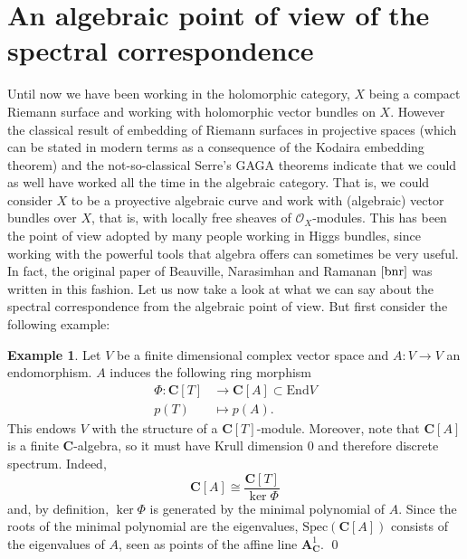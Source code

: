 \documentclass[12pt,a4paper]{book}
\theoremstyle{definition} \newtheorem{defn}[thm]{Definition}
\theoremstyle{definition} \newtheorem{ejemplo}[thm]{Example}
\theoremstyle{remark} \newtheorem{rem}[thm]{Remark}
\def\OO{\mathscr{O}}
\def\CC{\mathbf{C}}
\def\End{\mathrm{End}}
\def\Spec{\mathrm{Spec}}
\begin{document}
	      \section{An algebraic point of view of the spectral correspondence}
	      Until now we have been working in the holomorphic category, $X$ being a compact Riemann surface and working with holomorphic vector bundles on $X$. However the classical result of embedding of Riemann surfaces in projective spaces (which can be stated in modern terms as a consequence of the Kodaira embedding theorem) and the not-so-classical Serre's GAGA theorems indicate that we could as well have worked all the time in the algebraic category. That is, we could consider $X$ to be a proyective algebraic curve and work with (algebraic) vector bundles over $X$, that is, with locally free sheaves of $\OO_X$-modules. This has been the point of view adopted by many people working in Higgs bundles, since working with the powerful tools that algebra offers can sometimes be very useful. In fact, the original paper of Beauville, Narasimhan and Ramanan $\cite{bnr}$ was written in this fashion. Let us now take a look at what we can say about the spectral correspondence from the algebraic point of view. But first consider the following example:
	      \begin{ejemplo}
		Let $V$ be a finite dimensional complex vector space and $A:V\rightarrow V$ an endomorphism. $A$ induces the following ring morphism
		\begin{align*}
		  \Phi :\CC[T]&\longrightarrow \CC[A]\subset \End V\\ 
		    p(T) &\longmapsto p(A). 
		  \end{align*}
		  This endows $V$ with the structure of a $\CC[T]$-module. Moreover, note that $\CC[A]$ is a finite $\CC$-algebra, so it must have Krull dimension $0$ and therefore discrete spectrum. Indeed, 
		  \begin{equation*}
		    \CC[A] \cong \frac{\CC[T]}{\ker \Phi}
		  \end{equation*}
		  and, by definition, $\ker \Phi$ is generated by the minimal polynomial of $A$. Since the roots of the minimal polynomial are the eigenvalues, $\Spec(\CC[A])$ consists of the eigenvalues of $A$, seen as points of the affine line $\mathbf{A}^1_\CC$.
		\qed
	      \end{ejemplo}
\end{document}
